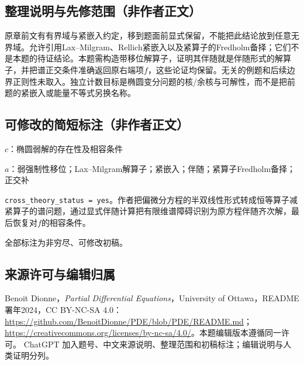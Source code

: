 \documentclass[UTF8,11pt]{ctexart}
\theoremstyle{definition}
\begin{document}
\subsection*{整理说明与先修范围（非作者正文）}
原章前文有有界域与紧嵌入约定，移到题面前显式保留，不能把此结论放到任意无界域。允许引用Lax--Milgram、Rellich紧嵌入以及紧算子的Fredholm备择；它们不是本题的待证结论。本题需构造带移位解算子，证明其伴随就是伴随形式的解算子，并把谱正交条件准确返回原右端项$f$，这些论证均保留。无关的例题和后续边界正则性未取入。独立计数目标是椭圆变分问题的核/余核与可解性，而不是把前题的紧嵌入或能量不等式另换名称。
\subsection*{可修改的简短标注（非作者正文）}
$c$：椭圆弱解的存在性及相容条件

$a$：弱强制性移位；Lax--Milgram解算子；紧嵌入；伴随；紧算子Fredholm备择；正交补

\texttt{cross\_theory\_status = yes}。作者把偏微分方程的半双线性形式转成恒等算子减紧算子的谱问题，通过显式伴随计算把有限维谱障碍识别为原方程伴随齐次解，最后恢复对$f$的相容条件。

全部标注为非穷尽、可修改初稿。
\subsection*{来源许可与编辑归属}
Benoit Dionne，\emph{Partial Differential Equations}，University of Ottawa，README署年2024，CC BY-NC-SA 4.0：\url{https://github.com/BenoitDionne/PDE/blob/PDE/README.md}；\url{https://creativecommons.org/licenses/by-nc-sa/4.0/}。本题编辑版本遵循同一许可。
ChatGPT 加入题号、中文来源说明、整理范围和初稿标注；编辑说明与人类证明分列。
\end{document}
